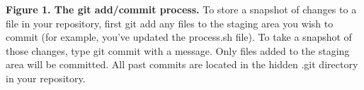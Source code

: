 \textbf{Figure 1. The git add/commit process.} To store a snapshot of changes to a file in your repository, first git add any files to the staging area you wish to commit (for example, you've updated the process.sh file). To take a snapshot of those changes, type git commit with a message. Only files added to the staging area will be committed. All past commits are located in the hidden .git directory in your repository. 